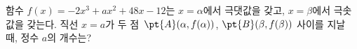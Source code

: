 함수 $f(x)=-2x^3+ax^2+48x-12$는 $x=\alpha$에서 극댓값을 갖고, $x=\beta$에서 극솟값을 갖는다. 직선 $x=a$가 두 점~$\pt{A}(\alpha{,}\mkern3mu\mathopen{}f(\alpha))$, $\pt{B}(\beta{,}\mkern3mu\mathopen{}f(\beta))$ 사이를 지날 때, 정수 $a$의 개수는?
